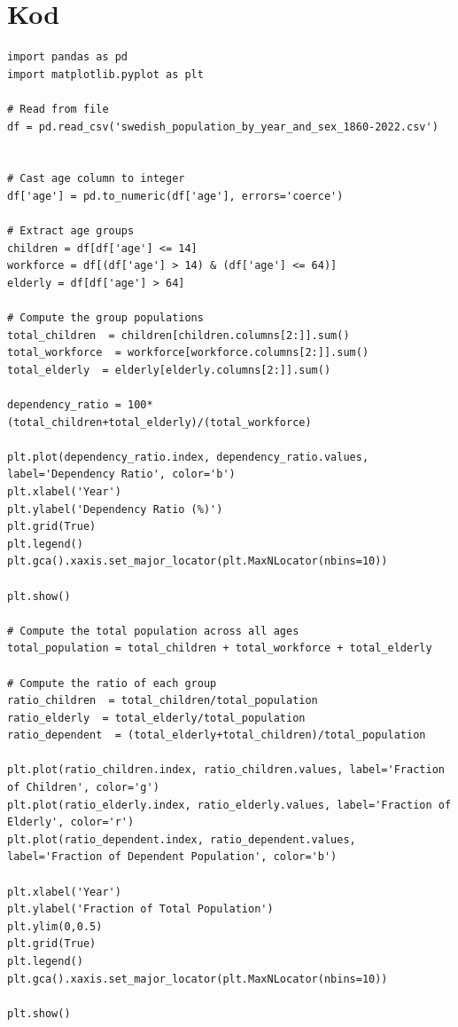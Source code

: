 \documentclass[a4paper]{article}
\begin{document}
\printbibliography
\appendix

\section*{Kod}
\label{app:code}

\begin{lstlisting}
import pandas as pd
import matplotlib.pyplot as plt

# Read from file
df = pd.read_csv('swedish_population_by_year_and_sex_1860-2022.csv')


# Cast age column to integer
df['age'] = pd.to_numeric(df['age'], errors='coerce')

# Extract age groups
children = df[df['age'] <= 14]
workforce = df[(df['age'] > 14) & (df['age'] <= 64)]
elderly = df[df['age'] > 64]

# Compute the group populations
total_children  = children[children.columns[2:]].sum()
total_workforce  = workforce[workforce.columns[2:]].sum()
total_elderly  = elderly[elderly.columns[2:]].sum()

dependency_ratio = 100*(total_children+total_elderly)/(total_workforce)

plt.plot(dependency_ratio.index, dependency_ratio.values, label='Dependency Ratio', color='b')
plt.xlabel('Year')
plt.ylabel('Dependency Ratio (%)')
plt.grid(True)
plt.legend()
plt.gca().xaxis.set_major_locator(plt.MaxNLocator(nbins=10))

plt.show()

# Compute the total population across all ages
total_population = total_children + total_workforce + total_elderly

# Compute the ratio of each group
ratio_children  = total_children/total_population
ratio_elderly  = total_elderly/total_population
ratio_dependent  = (total_elderly+total_children)/total_population

plt.plot(ratio_children.index, ratio_children.values, label='Fraction of Children', color='g')
plt.plot(ratio_elderly.index, ratio_elderly.values, label='Fraction of Elderly', color='r')
plt.plot(ratio_dependent.index, ratio_dependent.values, label='Fraction of Dependent Population', color='b')

plt.xlabel('Year')
plt.ylabel('Fraction of Total Population')
plt.ylim(0,0.5)
plt.grid(True)
plt.legend()
plt.gca().xaxis.set_major_locator(plt.MaxNLocator(nbins=10))

plt.show()

\end{lstlisting}
\end{document}
